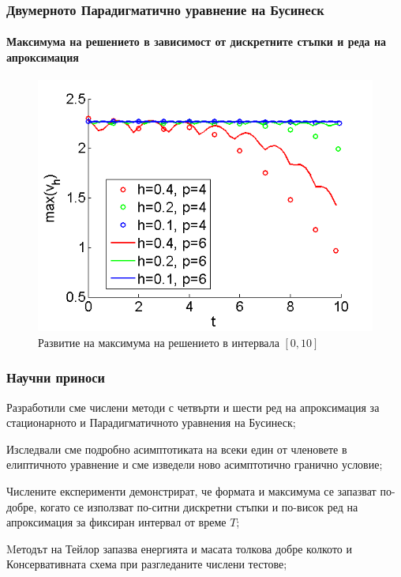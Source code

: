 \documentclass{beamer}
\begin{document}
\begin{frame}
\frametitle{Двумерното Парадигматично уравнение на Бусинеск}
\framesubtitle{Максимума на решението в зависимост от дискретните стъпки и реда на апроксимация}
\begin{figure}
	\includegraphics[width=0.65\linewidth]{Maximum_TaylorZeroBnd_50x50_bt3_c030.png}
\caption{Развитие на максимума на решението в интервала $[0, 10]$}

\end{figure}

\end{frame}

\begin{frame}
\frametitle{Научни приноси}

\begin{itemize}
{\small
  \item Разработили сме числени методи с четвърти и шести ред на апроксимация за стационарното и Парадигматичното уравнения на Бусинеск;
  \item Изследвали сме подробно асимптотиката на всеки един от членовете в елиптичното уравнение и сме изведели ново асимптотично гранично условие; 
  \item Числените експерименти демонстрират, че формата и максимума се запазват по-добре, когато се използват по-ситни дискретни стъпки и по-висок ред на апроксимация за фиксиран интервал от време $T$;
  \item Mетодът на Тейлор запазва енергията и масата толкова добре колкото и Консервативната схема при разгледаните числени тестове;
}
\end{itemize}

\end{frame}
\end{document}
